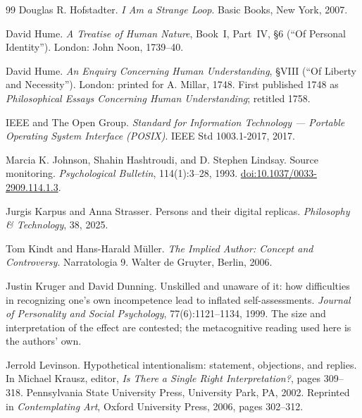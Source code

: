 \documentclass[11pt,a4paper]{article}
\theoremstyle{remark}\newtheorem{remark}[definition]{Remark}
\begin{document}
\begin{thebibliography}{99}
Douglas R. Hofstadter.
\newblock \emph{I Am a Strange Loop}.
\newblock Basic Books, New York, 2007.

David Hume.
\newblock \emph{A Treatise of Human Nature}, Book~I, Part~IV, \S6 (``Of Personal Identity'').
\newblock London: John Noon, 1739--40.

David Hume.
\newblock \emph{An Enquiry Concerning Human Understanding}, \S VIII (``Of Liberty and Necessity'').
\newblock London: printed for A. Millar, 1748. First published 1748 as \emph{Philosophical Essays Concerning Human Understanding}; retitled 1758.

IEEE and The Open Group.
\newblock \emph{Standard for Information Technology --- Portable Operating System Interface (POSIX)}.
\newblock IEEE Std 1003.1-2017, 2017.

Marcia K. Johnson, Shahin Hashtroudi, and D. Stephen Lindsay.
\newblock Source monitoring.
\newblock \emph{Psychological Bulletin}, 114(1):3--28, 1993.
\newblock \href{https://doi.org/10.1037/0033-2909.114.1.3}{doi:10.1037/0033-2909.114.1.3}.

Jurgis Karpus and Anna Strasser.
\newblock Persons and their digital replicas.
\newblock \emph{Philosophy \& Technology}, 38, 2025.

Tom Kindt and Hans-Harald M\"uller.
\newblock \emph{The Implied Author: Concept and Controversy}.
\newblock Narratologia 9. Walter de Gruyter, Berlin, 2006.

Justin Kruger and David Dunning.
\newblock Unskilled and unaware of it: how difficulties in recognizing one's own incompetence lead to inflated self-assessments.
\newblock \emph{Journal of Personality and Social Psychology}, 77(6):1121--1134, 1999. The size and interpretation of the effect are contested; the metacognitive reading used here is the authors' own.

Jerrold Levinson.
\newblock Hypothetical intentionalism: statement, objections, and replies.
\newblock In Michael Krausz, editor, \emph{Is There a Single Right Interpretation?}, pages 309--318. Pennsylvania State University Press, University Park, PA, 2002. Reprinted in \emph{Contemplating Art}, Oxford University Press, 2006, pages 302--312.


\end{thebibliography}
\end{document}
